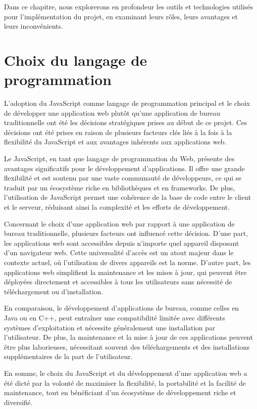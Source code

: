 Dans ce chapitre, nous explorerons en profondeur les outils et technologies utilisés pour l'implémentation du projet, en examinant leurs rôles, leurs avantages et leurs inconvénients.

\section{Choix du langage de programmation}

L'adoption du JavaScript comme langage de programmation principal et le choix de développer une application web plutôt qu'une application de bureau traditionnelle ont été les décisions stratégiques prises au début de ce projet. Ces décisions ont été prises en raison de plusieurs facteurs clés liés à la fois à la flexibilité du JavaScript et aux avantages inhérents aux applications web.

Le JavaScript, en tant que langage de programmation du Web, présente des avantages significatifs pour le développement d'applications. Il offre une grande flexibilité et est soutenu par une vaste communauté de développeurs, ce qui se traduit par un écosystème riche en bibliothèques et en frameworks. De plus, l'utilisation de JavaScript permet une cohérence de la base de code entre le client et le serveur, réduisant ainsi la complexité et les efforts de développement.

Concernant le choix d'une application web par rapport à une application de bureau traditionnelle, plusieurs facteurs ont influencé cette décision. D'une part, les applications web sont accessibles depuis n'importe quel appareil disposant d'un navigateur web. Cette universalité d'accès est un atout majeur dans le contexte actuel, où l'utilisation de divers appareils est la norme. D'autre part, les applications web simplifient la maintenance et les mises à jour, qui peuvent être déployées directement et accessibles à tous les utilisateurs sans nécessité de téléchargement ou d'installation.

En comparaison, le développement d'applications de bureau, comme celles en Java ou en C++, peut entraîner une compatibilité limitée avec différents systèmes d'exploitation et nécessite généralement une installation par l'utilisateur. De plus, la maintenance et la mise à jour de ces applications peuvent être plus laborieuses, nécessitant souvent des téléchargements et des installations supplémentaires de la part de l'utilisateur.

En somme, le choix du JavaScript et du développement d'une application web a été dicté par la volonté de maximiser la flexibilité, la portabilité et la facilité de maintenance, tout en bénéficiant d'un écosystème de développement riche et diversifié.

